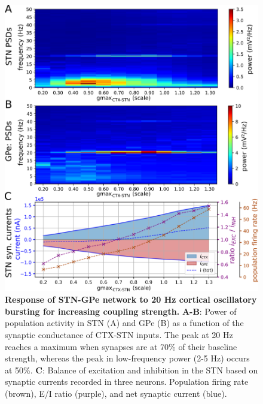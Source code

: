 %

\begin{figure}
\centering
\includegraphics[width=\textwidth]{ch_detailed_model/figs_split/fig_exogenous_ctx-resonance-example_A-psd-currents.png}
\caption{
\textbf{Response of STN-GPe network to 20 Hz cortical oscillatory bursting for increasing coupling strength.}
\textbf{A-B}: Power of population activity in STN (A) and GPe (B) as a function of the synaptic conductance of CTX-STN inputs. The peak at 20 Hz reaches a maximum when synapses are at 70\% of their baseline strength, whereas the peak in low-frequency power (2-5 Hz) occurs at 50\%.
\textbf{C}: Balance of excitation and inhibition in the STN based on synaptic currents recorded in three neurons. Population firing rate (brown), E/I ratio (purple), and net synaptic current (blue).
}
\label{fig:exogenous_ctx-resonance-example_A-psd-currents}
\end{figure}

